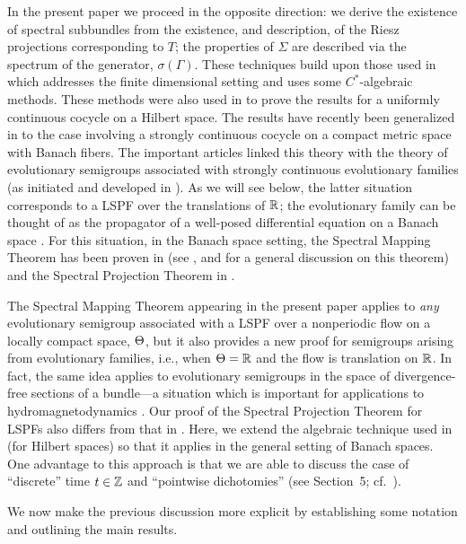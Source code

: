 In the present paper we proceed in the opposite direction:
we derive the existence of spectral subbundles from
the existence, and description, of the Riesz projections
corresponding to $T$; the properties of $\Sigma$ are described
via the spectrum of the generator, $\sigma(\Gamma)$.  These techniques
build upon those used in \cite{Ant} which
addresses the finite dimensional setting and uses
some $C^*$-algebraic methods. These methods were also used in \cite{LS}
to prove the results  for a uniformly continuous cocycle
on a Hilbert space.  The results have recently been
generalized in \cite{Rau} to the case involving a
strongly continuous cocycle on a compact metric space
with Banach fibers.  The important articles
\cite{Rau,Rau1,Rau2} linked this theory with the theory of
evolutionary semigroups associated with strongly continuous
evolutionary families (as initiated and developed in
\cite{Evans,Gold,Howland,Lum,Nei}).
As we will see below,
the latter situation corresponds to a LSPF over
the translations of ${\Bbb{R}}$; the evolutionary family can be thought
of as the propagator of a well-posed differential equation on a
Banach space \cite{Nag,Nag2,Tan}.
For this situation, in the Banach space setting,
the Spectral Mapping Theorem has been proven in \cite{LMS1,LMS2}
(see \cite{Henry1},\cite{Nag} and \cite{Pazy} for a general discussion
on this theorem)  and the Spectral Projection Theorem in
\cite{LMS1,LMS2,LatRand,Rab,Rau1,Rau2}.

The Spectral Mapping Theorem appearing in the present paper applies to
{\em any} evolutionary semigroup associated with a
LSPF over a nonperiodic flow
on a locally
compact space, $\Theta$, but it also provides a new proof for semigroups
arising from evolutionary families, i.e., when $\Theta={\Bbb{R}}$ and the flow
is translation on ${\Bbb{R}}$.  In fact, the same idea applies to
evolutionary semigroups in the space of divergence-free sections of a
bundle---a situation which is important for applications
to hydromagnetodynamics \cite{CLMS}.
Our proof of the Spectral Projection
Theorem for LSPFs also differs from that in \cite{Rau}.
Here, we extend the algebraic technique used in
\cite{Ant,LS} (for Hilbert spaces) so that it
applies in the general setting of Banach spaces.
One advantage to this approach is that
we are able to discuss the case of ``discrete'' time
$t\in{\Bbb{Z}}$ and ``pointwise dichotomies'' (see Section~5;
cf.~\cite{ChLe1}).

We now make the previous discussion more explicit by
establishing some notation and outlining the main results.

